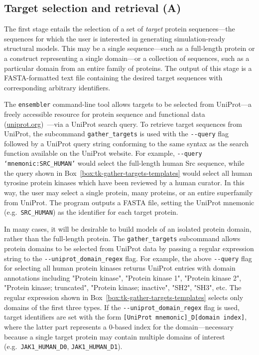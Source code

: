 \documentclass[aps,prl,preprint,nofootinbib,superscriptaddress,linenumbers]{revtex4-1}
\begin{document}
\subsection{Target selection and retrieval (A)}

The first stage entails the selection of a set of \emph{target} protein sequences---the sequences for which the user is interested in generating simulation-ready structural models.
This may be a single sequence---such as a full-length protein or a construct representing a single domain---or a collection of sequences, such as a particular domain from an entire family of proteins.
The output of this stage is a FASTA-formatted text file containing the desired target sequences with corresponding arbitrary identifiers.

The {\tt ensembler} command-line tool allows targets to be selected from UniProt---a freely accessible resource for protein sequence and functional data (\href{http://www.uniprot.org/}{uniprot.org})~\cite{uniprot:2015}---via a UniProt search query.
To retrieve target sequences from UniProt, the subcommand {\tt gather\_targets} is used with the {\tt -{}-query} flag followed by a UniProt query string conforming to the same syntax as the search function available on the UniProt website.
For example, {\tt -{}-query `mnemonic:SRC\_HUMAN'} would select the full-length human Src sequence, while the query shown in Box~\ref{box:tk-gather-targets-templates} would select all human tyrosine protein kinases which have been reviewed by a human curator.
In this way, the user may select a single protein, many proteins, or an entire superfamily from UniProt.
The program outputs a FASTA file, setting the UniProt mnemonic (e.g.~{\tt SRC\_HUMAN}) as the identifier for each target protein.

In many cases, it will be desirable to build models of an isolated protein domain, rather than the full-length protein.
The {\tt gather\_targets} subcommand allows protein domains to be selected from UniProt data by passing a regular expression string to the {\tt -{}-uniprot\_domain\_regex} flag. 
For example, the above {\tt -{}-query} flag for selecting all human protein kinases returns UniProt entries with domain annotations including "Protein kinase", "Protein kinase 1", "Protein kinase 2", "Protein kinase; truncated", "Protein kinase; inactive", "SH2", "SH3", etc.
The regular expression shown in Box~\ref{box:tk-gather-targets-templates} selects only domains of the first three types.
If the {\tt -{}-uniprot\_domain\_regex} flag is used, target identifiers are set with the form {\tt [UniProt mnemonic]\_D[domain index]}, where the latter part represents a 0-based index for the domain---necessary because a single target protein may contain multiple domains of interest (e.g.~{\tt JAK1\_HUMAN\_D0}, {\tt JAK1\_HUMAN\_D1}).
\end{document}
